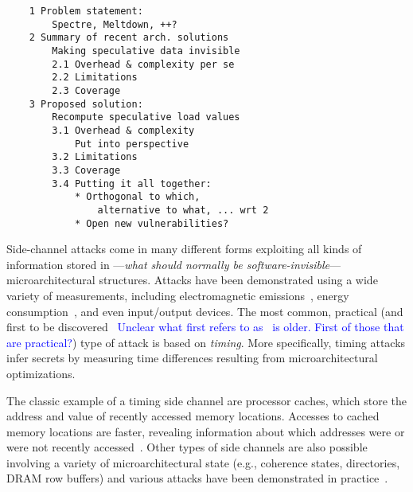 \begin{verbatim}
    1 Problem statement: 
        Spectre, Meltdown, ++?
    2 Summary of recent arch. solutions
        Making speculative data invisible
        2.1 Overhead & complexity per se
        2.2 Limitations
        2.3 Coverage
    3 Proposed solution: 
        Recompute speculative load values
        3.1 Overhead & complexity 
            Put into perspective
        3.2 Limitations 
        3.3 Coverage
        3.4 Putting it all together:
            * Orthogonal to which, 
                alternative to what, ... wrt 2
            * Open new vulnerabilities?
\end{verbatim}



Side-channel attacks come in many different forms exploiting all kinds of information stored in ---\emph{what should normally be software-invisible}--- microarchitectural structures. Attacks have been demonstrated using a wide variety of measurements, including electromagnetic emissions~\cite{agrawal2002side}, energy consumption~\cite{kocher1999differential}, and even input/output devices\cite{genkin2014rsa,ferrigno2008aes,carmon2017photonic}. The most common, practical (and first to be discovered~\cite{bernstein2005cache} \textcolor{blue}{Unclear what first refers to as~\cite{agrawal2002side} is older. First of those that are practical?}) type of attack is based on \emph{timing}. More specifically, timing attacks infer secrets by measuring time differences resulting from microarchitectural optimizations.

The classic example of a timing side channel are processor caches, which store the address and value of recently accessed memory locations. Accesses to cached memory locations are faster, revealing information about which addresses were or were not recently accessed~\cite{yarom_flush+_2014,liu15llc,irazoqui_cross_2016}. Other types of side channels are also possible involving a variety of microarchitectural state (e.g., coherence states, directories, DRAM row buffers) 
and various attacks have been demonstrated in practice~\cite{}.

